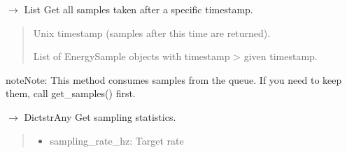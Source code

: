\documentclass[letterpaper,10pt,english]{sphinxmanual}
\begin{document}
\begin{fulllineitems}
\begin{fulllineitems}
\label{\detokenize{core.utils.sampling:core.utils.sampling.HighFrequencySampler.get_samples_since}}
\pysigstartsignatures
\pysiglinewithargsret
{}
{}
{{ $\rightarrow$ List\DUrole{p}{{[}}{\hyperref[\detokenize{core.utils.sampling:core.utils.sampling.EnergySample}]{\sphinxcrossref{EnergySample}}}\DUrole{p}{{]}}}}
\pysigstopsignatures
\sphinxAtStartPar
Get all samples taken after a specific timestamp.
\begin{quote}\begin{description}
\sphinxAtStartPar
{} \textendash{} Unix timestamp (samples after this time are returned).

\sphinxAtStartPar
List of EnergySample objects with timestamp \textgreater{} given timestamp.

\end{description}\end{quote}

\begin{sphinxadmonition}{note}{Note:}
\sphinxAtStartPar
This method consumes samples from the queue. If you need to keep
them, call get\_samples() first.
\end{sphinxadmonition}

\end{fulllineitems}


\begin{fulllineitems}
\label{\detokenize{core.utils.sampling:core.utils.sampling.HighFrequencySampler.get_statistics}}
\pysigstartsignatures
\pysiglinewithargsret
{}
{}
{{ $\rightarrow$ Dict\DUrole{p}{{[}}strAny\DUrole{p}{{]}}}}
\pysigstopsignatures
\sphinxAtStartPar
Get sampling statistics.
\begin{quote}\begin{description}
\sphinxAtStartPar
\begin{itemize}
\item {} 
\sphinxAtStartPar
sampling\_rate\_hz: Target rate


\end{itemize}
\end{description}
\end{quote}
\end{fulllineitems}
\end{fulllineitems}
\end{document}
